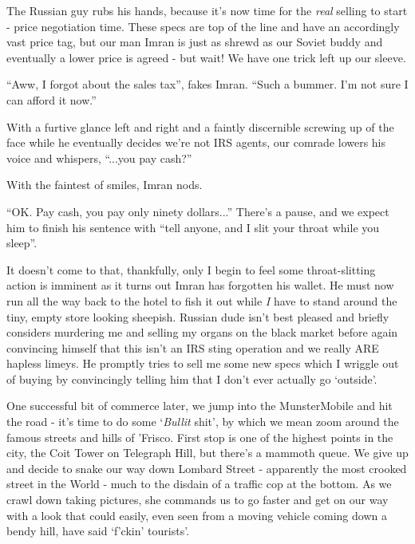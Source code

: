 \documentclass[a5paper,titlepage,11pt]{book}
\begin{document}
The Russian guy rubs his hands, because it's now time for the \emph{real} selling to start - price negotiation time.  These specs are top of the line and have an accordingly vast price tag, but our man Imran is just as shrewd as our Soviet buddy and eventually a lower price is agreed - but wait!  We have one trick left up our sleeve.

``Aww, I forgot about the sales tax'', fakes Imran.  ``Such a bummer.  I'm not sure I can afford it now.''

With a furtive glance left and right and a faintly discernible screwing up of the face while he eventually decides we're not IRS agents, our comrade lowers his voice and whispers, ``...you pay cash?''

With the faintest of smiles, Imran nods.

``OK.  Pay cash, you pay only ninety dollars...'' There's a pause, and we expect him to finish his sentence with ``tell anyone, and I slit your throat while you sleep''.

It doesn't come to that, thankfully, only I begin to feel some throat-slitting action is imminent as it turns out Imran has forgotten his wallet.  He must now run all the way back to the hotel to fish it out while \emph{I} have to stand around the tiny, empty store looking sheepish.  Russian dude isn't best pleased and briefly considers murdering me and selling my organs on the black market before again convincing himself that this isn't an IRS sting operation and we really ARE hapless limeys.  He promptly tries to sell me some new specs which I wriggle out of buying by convincingly telling him that I don't ever actually go `outside'.

One successful bit of commerce later, we jump into the MunsterMobile and hit the road - it's time to do some `\emph{Bullit} shit', by which we mean zoom around the famous streets and hills of 'Frisco.  First stop is one of the highest points in the city, the Coit Tower on Telegraph Hill, but there's a mammoth queue.  We give up and decide to snake our way down Lombard Street - apparently the most crooked street in the World - much to the disdain of a traffic cop at the bottom.  As we crawl down taking pictures, she commands us to go faster and get on our way with a look that could easily, even seen from a moving vehicle coming down a bendy hill, have said `f'ckin' tourists'.
\end{document}
